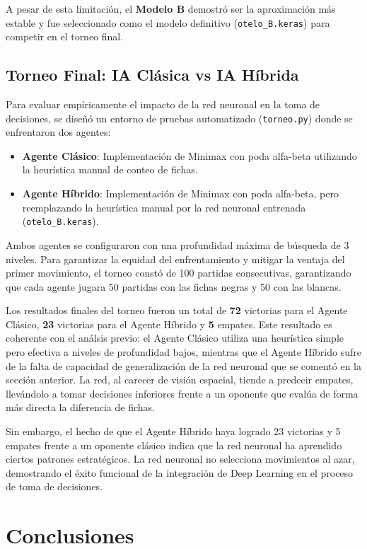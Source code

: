 \documentclass[conference]{IEEEtran}
\begin{document}
A pesar de esta limitación, el \textbf{Modelo B} demostró ser la aproximación más estable y fue seleccionado como el modelo definitivo (\texttt{otelo\_B.keras}) para competir en el torneo final.

\subsection{Torneo Final: IA Clásica vs IA Híbrida}
Para evaluar empíricamente el impacto de la red neuronal en la toma de decisiones, se diseñó un entorno de pruebas automatizado (\texttt{torneo.py}) donde se enfrentaron dos agentes:
\begin{itemize}
    \item \textbf{Agente Clásico}: Implementación de Minimax con poda alfa-beta utilizando la heurística manual de conteo de fichas.
    \item \textbf{Agente Híbrido}: Implementación de Minimax con poda alfa-beta, pero reemplazando la heurística manual por la red neuronal entrenada (\texttt{otelo\_B.keras}).
\end{itemize}

Ambos agentes se configuraron con una profundidad máxima de búsqueda de 3 niveles. Para garantizar la equidad del enfrentamiento y mitigar la ventaja del primer movimiento, el torneo 
constó de 100 partidas consecutivas, garantizando que cada agente jugara 50 partidas con las fichas negras y 50 con las blancas.

Los resultados finales del torneo fueron un total de \textbf{72} victorias para el Agente Clásico, \textbf{23} victorias para el Agente Híbrido y \textbf{5} empates. 
Este resultado es coherente con el análsis previo: el Agente Clásico utiliza una heurística simple pero efectiva a niveles de profundidad bajos, mientras que el Agente Híbrido sufre
de la falta de capacidad de generalización de la red neuronal que se comentó en la sección anterior. La red, al carecer de visión espacial, tiende a predecir empates, llevándolo a tomar 
decisiones inferiores frente a un oponente que evalúa de forma más directa la diferencia de fichas.

Sin embargo, el hecho de que el Agente Híbrido haya logrado 23 victorias y 5 empates frente a un oponente clásico indica que la red neuronal ha aprendido ciertos patrones estratégicos.
La red neuronal no selecciona movimientos al azar, demostrando el éxito funcional de la integración de Deep Learning en el proceso de toma de decisiones.


\section{Conclusiones}
\end{document}
